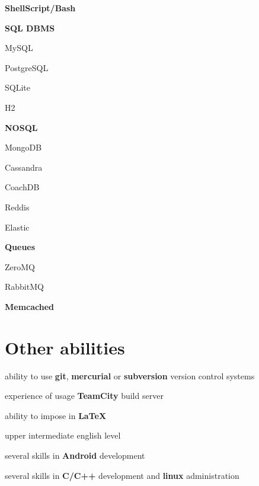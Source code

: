 \documentclass[10pt, a4paper, english]{article}
\begin{document}
\begin{multicols}{3}
\begin {list}{\textbullet}{}
\begin {list}{\circ}{}
        \end{list}
      \item \textbf{ShellScript/Bash}
      \columnbreak
      \item \textbf{SQL DBMS}
        \begin {list}{\circ}{}
          \item MySQL
          \item PostgreSQL
          \item SQLite
          \item H2
        \end{list}
      \item \textbf{NOSQL}
        \begin {list}{\circ}{}
          \item MongoDB
          \item Cassandra
          \item CoachDB
          \item Reddis
          \item Elastic
        \end{list}
      \item \textbf{Queues}
        \begin {list}{\circ}{}
          \item ZeroMQ
          \item RabbitMQ
        \end{list}
      \item \textbf{Memcached}
    \end{list}
  \end{multicols}


\section* {Other abilities}
\begin {list}{\textbullet}{}
\item ability to use \textbf{git}, \textbf{mercurial} or \textbf{subversion} version control systems
\item experience of usage \textbf{TeamCity} build server
\item ability to impose in \textbf{LaTeX}
\item upper intermediate english level
\item several skills in \textbf{Android} development
\item several skills in \textbf{C/C++} development and \textbf{linux} administration
\end {list}
\end{document}
